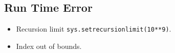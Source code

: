 \documentclass[
	a4paper,
	landscape,
	10pt,
	article
]{article}
\begin{document}
\subsection*{Run Time Error}
\begin{itemize}
\item Recursion limit \texttt{sys.setrecursionlimit(10**9)}.
\item Index out of bounds.
\end{itemize}
\end{document}
